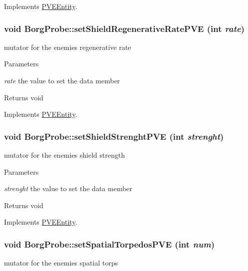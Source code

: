 Implements \hyperlink{classPVEEntity}{PVEEntity}.

\hypertarget{classBorgProbe_a6cdeb57ba40d96381f4178d01e3d4cae}{
\subsubsection[{setShieldRegenerativeRatePVE}]{\setlength{\rightskip}{0pt plus 5cm}void BorgProbe::setShieldRegenerativeRatePVE (int {\em rate})}}
\label{db/deb/classBorgProbe_a6cdeb57ba40d96381f4178d01e3d4cae}
mutator for the enemies regenerative rate


\begin{DoxyParams}{Parameters}
\item[{\em rate}]the value to set the data member\end{DoxyParams}
\begin{DoxyReturn}{Returns}
void 
\end{DoxyReturn}


Implements \hyperlink{classPVEEntity}{PVEEntity}.

\hypertarget{classBorgProbe_a1866290e2fb1a65e12d4448bcba5d932}{
\subsubsection[{setShieldStrenghtPVE}]{\setlength{\rightskip}{0pt plus 5cm}void BorgProbe::setShieldStrenghtPVE (int {\em strenght})}}
\label{db/deb/classBorgProbe_a1866290e2fb1a65e12d4448bcba5d932}
mutator for the enemies shield strength


\begin{DoxyParams}{Parameters}
\item[{\em strenght}]the value to set the data member\end{DoxyParams}
\begin{DoxyReturn}{Returns}
void 
\end{DoxyReturn}


Implements \hyperlink{classPVEEntity}{PVEEntity}.

\hypertarget{classBorgProbe_a69c828eb05d8d652d66b57e12caa96fd}{
\subsubsection[{setSpatialTorpedosPVE}]{\setlength{\rightskip}{0pt plus 5cm}void BorgProbe::setSpatialTorpedosPVE (int {\em num})}}
\label{db/deb/classBorgProbe_a69c828eb05d8d652d66b57e12caa96fd}
mutator for the enemies spatial torps


